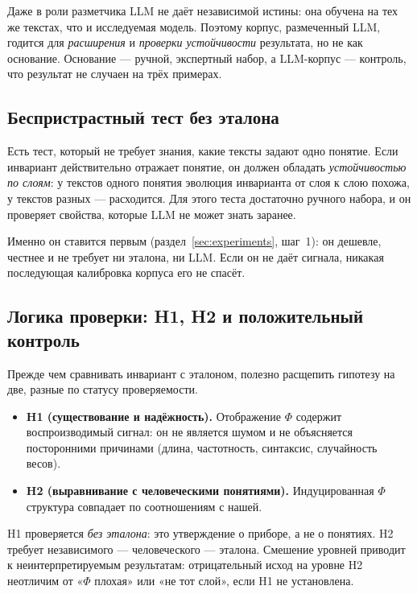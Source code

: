 \documentclass[11pt,a4paper]{article}
\theoremstyle{definition}
\theoremstyle{plain}
\begin{document}
Даже в роли разметчика LLM не даёт независимой истины: она обучена на тех же текстах, что и
исследуемая модель. Поэтому корпус, размеченный LLM, годится для \emph{расширения} и
\emph{проверки устойчивости} результата, но не как основание. Основание — ручной,
экспертный набор, а LLM-корпус — контроль, что результат не случаен на трёх примерах.

\subsection{Беспристрастный тест без эталона}

Есть тест, который не требует знания, какие тексты задают одно понятие. Если инвариант
действительно отражает понятие, он должен обладать \emph{устойчивостью по слоям}: у текстов
одного понятия эволюция инварианта от слоя к слою похожа, у текстов разных — расходится. Для
этого теста достаточно ручного набора, и он проверяет свойства, которые LLM не может знать
заранее.

Именно он ставится первым (раздел~\ref{sec:experiments}, шаг~1): он дешевле, честнее и
не требует ни эталона, ни LLM. Если он не даёт сигнала, никакая последующая калибровка корпуса
его не спасёт.

\subsection{Логика проверки: H1, H2 и положительный контроль}\label{sec:logic}

Прежде чем сравнивать инвариант с эталоном, полезно расщепить гипотезу на две, разные по
статусу проверяемости.

\begin{itemize}[label=(\roman*)]
\item \textbf{H1 (существование и надёжность).} Отображение $\Phi$ содержит воспроизводимый
сигнал: он не является шумом и не объясняется посторонними причинами (длина, частотность,
синтаксис, случайность весов).
\item \textbf{H2 (выравнивание с человеческими понятиями).} Индуцированная $\Phi$ структура
совпадает по соотношениям с нашей.
\end{itemize}

H1 проверяется \emph{без эталона}: это утверждение о приборе, а не о понятиях. H2 требует
независимого — человеческого — эталона. Смешение уровней приводит к неинтерпретируемым
результатам: отрицательный исход на уровне H2 неотличим от «$\Phi$ плохая» или «не тот
слой», если H1 не установлена.
\end{document}
